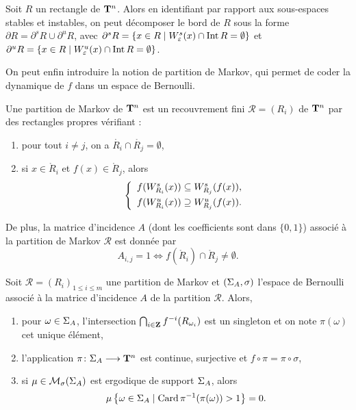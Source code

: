   \begin{proposition} \label{prop:bord}
    Soit $R$ un rectangle de $\mathbf T^n$. Alors en identifiant par rapport aux sous-espaces stables et instables,
    on peut décomposer le bord de $R$ sous la forme $\partial R = \partial^s R \cup \partial^u R$,
    avec $\partial^s R = \{x \in R \mid W^s_{\varepsilon}(x) \cap \operatorname{Int}{R} = \emptyset\}$
    et $\partial^u R = \{x \in R \mid W^u_{\varepsilon}(x) \cap \operatorname{Int}{R}   = \emptyset\}$.
  \end{proposition}

  On peut enfin introduire la notion de partition de Markov, qui permet de coder la dynamique de $f$  dans un espace de Bernoulli.

  \begin{definition}
    Une partition de Markov de $\mathbf T^n$ est un recouvrement fini $\mathcal R = (R_i)$ de $\mathbf T^n$ par des rectangles propres vérifiant :
    \begin{enumerate}
      \item pour tout $i \not= j$, on a $\mathring{R_i} \cap \mathring{R_j} = \emptyset$,
      \item si $x \in \mathring R_i$ et $f(x) \in \mathring R_j$, alors
	$$\left\{\begin{array}{l}
	    f(\Ws[R_i]{x}) \subseteq \Ws[R_j]{f(x)}, \vspace{0.3em}\\
	  f(\Wu[R_i]{x}) \supseteq \Wu[R_j]{f(x)}.
	\end{array}\right.$$
    \end{enumerate}

    De plus, la matrice d'incidence $A$ (dont les coefficients sont dans $\{0, 1\}$) associé à la partition de Markov $\mathcal R$ est donnée par
    $$A_{i,j} = 1 \iff f(\mathring R_i) \cap \mathring R_j \not= \emptyset.$$
  \end{definition}

  \begin{theorem} \label{th:markov}
    Soit $\mathcal R = (R_i)_{1 \leq i \leq m}$ une partition de Markov et
    $(\Sigma_A, \sigma)$ l'espace de Bernoulli associé à la matrice d'incidence $A$ de la partition $\mathcal R$.
    Alors,
    \begin{enumerate}
      \item pour $\omega \in \Sigma_A$, l'intersection $\bigcap_{i \in \mathbf Z}{f^{-i}(R_{\omega_i})}$ est un singleton et on note $\pi(\omega)$ cet unique élément,
      \item l'application $\pi \colon \Sigma_A \longrightarrow \mathbf T^n$ est continue, surjective et $f \circ \pi = \pi \circ \sigma$,
      \item si $\mu \in \mathcal{M}_{\sigma}(\Sigma_{A})$ est ergodique de support $\Sigma_A$, alors
	$$\mu \left\{\omega \in \Sigma_A \mid \operatorname{Card}{\pi^{-1}(\pi(\omega))} > 1\right\} = 0.$$
    \end{enumerate}
  \end{theorem}

